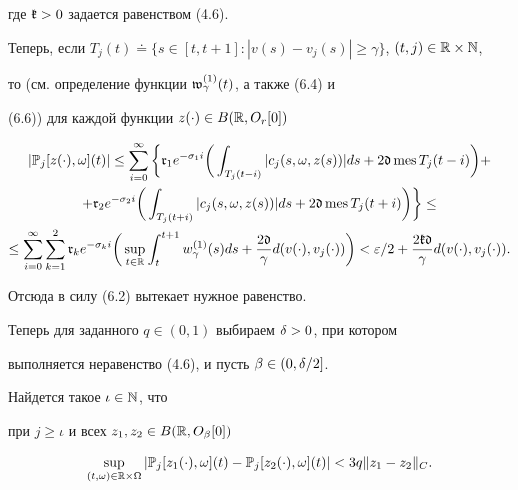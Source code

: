 где $\frak k>0$ задается равенством (4.6).


Теперь, если $T_{j}(t)\doteq\{s\in [t,t+1]:


|v(s)-v_{j}(s)|\ge\gamma\}$, $(t,j)\in\R\times\Bbb N$,


то (см. определение функции $\frak w_{\gamma}^{(1)}(t)$, а также (6.4) и


(6.6)) для каждой функции $z(\cdot)\in B(\Bbb R,O_{r}[0])$


\begin{multline*}


|\Bbb P_{j}[z(\cdot),\om](t)|\le\sum\lt_{i=0}^{\infty}


\bigg\{\frak r_{1}e^{-\sigma_{1}i}


\bigg(\int_{T_{j}(t-i)}|c_{j}(s,\om,z(s))|ds+


2\frak d\mes{T_{j}(t-i)}\bigg)+\\


%


+\frak r_{2}e^{-\sigma_{2}i}\bigg(\int_{T_{j}(t+i)}|c_{j}(s,\om,z(s))|ds


+2\frak d\mes{T_{j}(t+i)}\bigg)\bigg\}\le \\


%


\le\sum\lt_{i=0}^{\infty}\sum\lt_{k=1}^{2}\frak r_{k}e^{-\sigma_{k}i}


\bigg(\sup\lt_{t\in\R}\int_{t}^{t+1}


w_{\gamma}^{(1)}(s)ds+\frac{2\frak d}{\gamma}d(v(\cdot),v_{j}(\cdot))\bigg)<


\ve/2+\frac{2\frak k\frak d}{\gamma}d(v(\cdot),v_{j}(\cdot)).


\end{multline*}


Отсюда в силу (6.2) вытекает нужное равенство.





Теперь для заданного $q\in (0,1)$ выбираем $\delta>0$, при котором


выполняется неравенство (4.6), и пусть $\beta\in (0,\delta/2]$.





\begin{lems}


Найдется такое $\iota\in\Bbb N$, что


при $j\ge\iota$ и всех $z_{1}, z_{2}\in B(\Bbb R,O_{\beta}[0])$


$$


\sup\lt_{(t,\om)\in\R\times\Om}


|\Bbb P_{j}[z_{1}(\cdot),\om](t)-\Bbb P_{j}[z_{2}(\cdot),\om](t)|


<3q\|z_{1}-z_{2}\|_{C}.


$$


\end{lems}





